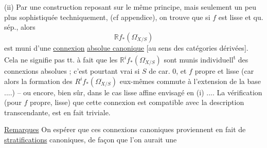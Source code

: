 (ii) Par une construction reposant  sur le même principe, mais seulement un peu plus sophistiquée techniquement, (cf appendice), on trouve que si $f$ est lisse  et qu. sép., alors
\[
\mathbb R f_*(\Omega^{\cdot}_{X/S})
\]
est muni d'une \uline{connexion} \uline{absolue canonique} [au sens des catégories dérivées]. Cela ne signifie pas tt. à fait que les $\mathbb R^i f_*(\Omega^{\cdot}_{X/S})$ sont munis individuell\textsuperscript{t} des connexions absolues ; c'est pourtant vrai si $S$ de car. $0$, et $f$ propre et lisse (car alors la formation des $R^i f_*(\Omega^{\cdot}_{X/S})$ eux-mêmes commute à l'extension de la base ....) -- ou encore, bien sûr, dans le cas lisse affine envisagé en (i) .... La vérification (pour $f$ propre, lisse) que cette connexion est compatible avec la description transcendante, est en fait triviale.

\uline{Remarques} On  espérer que ces connexions canoniques proviennent en fait de \uline{stratifications} canoniques, de façon que l'on aurait une

